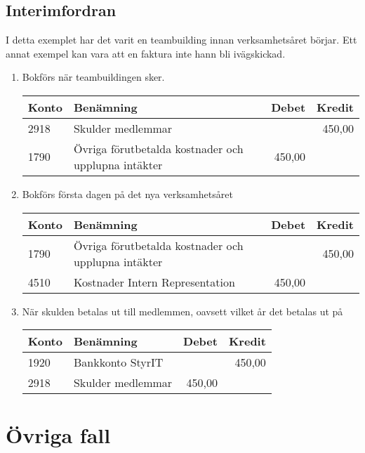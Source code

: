 \documentclass{article}
\begin{document}
\subsection{Interimfordran}
I detta exemplet har det varit en teambuilding innan verksamhetsåret börjar. Ett annat exempel kan vara att en faktura inte hann bli ivägskickad.  
\begin{enumerate}
\item Bokförs när teambuildingen sker.

\begin{tabular}{l | l | r | r}
\hline
Konto & Benämning & Debet & Kredit \\
\hline
2918 & Skulder medlemmar & & 450,00 \\
1790 & Övriga förutbetalda kostnader och upplupna intäkter & 450,00 &  \\
\end{tabular}

\item Bokförs första dagen på det nya verksamhetsåret  

\begin{tabular}{l | l | r | r}
\hline
Konto & Benämning & Debet & Kredit \\
\hline
1790 & Övriga förutbetalda kostnader och upplupna intäkter &  & 450,00\\
4510 & Kostnader Intern Representation & 450,00 &  \\
\end{tabular}

\item När skulden betalas ut till medlemmen, oavsett vilket år det betalas ut på

\begin{tabular}{l | l | r | r}
\hline
Konto & Benämning & Debet & Kredit \\
\hline
1920 & Bankkonto StyrIT & & 450,00  \\
2918 & Skulder medlemmar & 450,00 & \\
\end{tabular}
\end{enumerate}



\section{Övriga fall}
\end{document}
